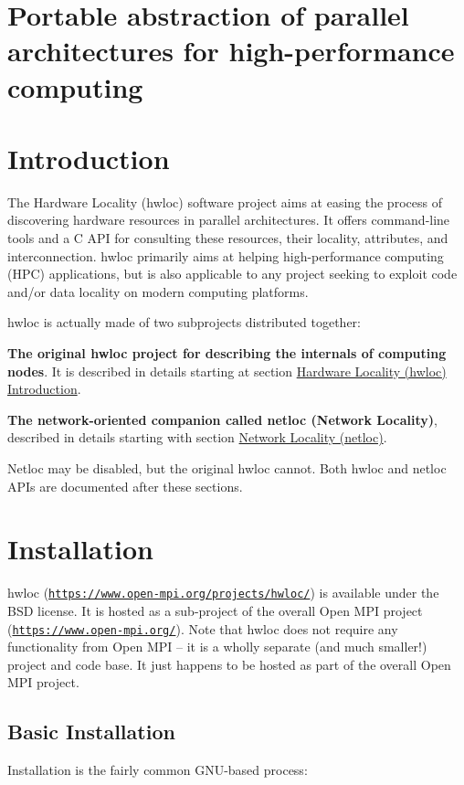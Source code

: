 \section*{Portable abstraction of parallel architectures for high-\/performance computing}





 \hypertarget{index_common_introduction}{}\section{Introduction}\label{index_common_introduction}
The Hardware Locality (hwloc) software project aims at easing the process of discovering hardware resources in parallel architectures. It offers command-\/line tools and a C A\+PI for consulting these resources, their locality, attributes, and interconnection. hwloc primarily aims at helping high-\/performance computing (H\+PC) applications, but is also applicable to any project seeking to exploit code and/or data locality on modern computing platforms.

hwloc is actually made of two subprojects distributed together\+: 
\begin{DoxyItemize}
\item {\bfseries The original hwloc project for describing the internals of computing nodes}. It is described in details starting at section \hyperlink{a00379}{Hardware Locality (hwloc) Introduction}.  
\item {\bfseries The network-\/oriented companion called netloc (Network Locality)}, described in details starting with section \hyperlink{a00396}{Network Locality (netloc)}.  
\end{DoxyItemize}



Netloc may be disabled, but the original hwloc cannot. Both hwloc and netloc A\+P\+Is are documented after these sections.

 \hypertarget{index_common_installation}{}\section{Installation}\label{index_common_installation}
hwloc (\href{https://www.open-mpi.org/projects/hwloc/}{\tt https\+://www.\+open-\/mpi.\+org/projects/hwloc/}) is available under the B\+SD license. It is hosted as a sub-\/project of the overall Open M\+PI project (\href{https://www.open-mpi.org/}{\tt https\+://www.\+open-\/mpi.\+org/}). Note that hwloc does not require any functionality from Open M\+PI -- it is a wholly separate (and much smaller!) project and code base. It just happens to be hosted as part of the overall Open M\+PI project.\hypertarget{index_basic_installation}{}\subsection{Basic Installation}\label{index_basic_installation}
Installation is the fairly common G\+N\+U-\/based process\+:

